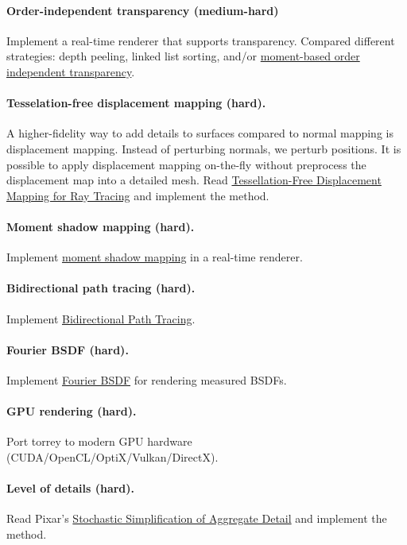 \paragraph{Order-independent transparency (medium-hard)}
Implement a real-time renderer that supports transparency. Compared different strategies: depth peeling, linked list sorting, and/or \href{https://momentsingraphics.de/I3D2018.html}{moment-based order independent transparency}.

\paragraph{Tesselation-free displacement mapping (hard).}
A higher-fidelity way to add details to surfaces compared to normal mapping is displacement mapping. Instead of perturbing normals, we perturb positions. It is possible to apply displacement mapping on-the-fly without preprocess the displacement map into a detailed mesh. Read \href{https://perso.telecom-paristech.fr/boubek/papers/TFDM/}{Tessellation-Free Displacement Mapping for Ray Tracing} and implement the method.

\paragraph{Moment shadow mapping (hard).}
Implement \href{https://momentsingraphics.de/I3D2015.html}{moment shadow mapping} in a real-time renderer.

\paragraph{Bidirectional path tracing (hard).}
Implement \href{https://www.pbr-book.org/3ed-2018/Light_Transport_III_Bidirectional_Methods/Bidirectional_Path_Tracing}{Bidirectional Path Tracing}.

\paragraph{Fourier BSDF (hard).}
Implement \href{https://www.pbr-book.org/3ed-2018/Reflection_Models/Fourier_Basis_BSDFs}{Fourier BSDF} for rendering measured BSDFs.

\paragraph{GPU rendering (hard).}
Port torrey to modern GPU hardware (CUDA/OpenCL/OptiX/Vulkan/DirectX).

\paragraph{Level of details (hard).}
Read Pixar's \href{https://graphics.pixar.com/library/StochasticSimplification/paper.pdf}{Stochastic Simplification of Aggregate Detail} and implement the method.





